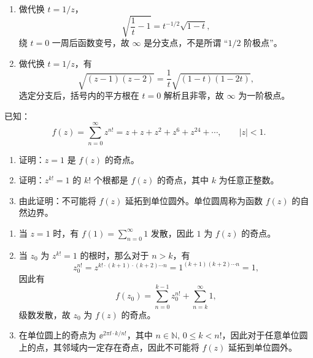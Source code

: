 \begin{question}
\begin{solution}
\begin{enumerate}
  \item 做代换 \(t=1/z\)，
   \[
   \sqrt{\frac{1}{t}-1} = t^{-1/2}\sqrt{1-t},
   \]
   绕 \(t=0\) 一周后函数变号，故 \(\infty\) 是分支点，不是所谓
   “\(1/2\) 阶极点”。

  \item 做代换 \(t=1/z\)，有
   \[
   \sqrt{(z-1)(z-2)} = \frac{1}{t}\sqrt{(1-t)(1-2t)},
   \]
   选定分支后，括号内的平方根在 \(t=0\) 解析且非零，故
   \(\infty\) 为一阶极点。
\end{enumerate}
\end{solution}
\end{question}

\begin{question}
已知：
\[
f(z)=\sum_{n=0}^\infty z^{n!}=z+z+z^2+z^6+z^{24}+\cdots,\qquad |z|<1.
\]
\begin{enumerate}
  \item 证明：\(z=1\) 是 \(f(z)\) 的奇点。
  \item 证明：\(z^{k!}=1\) 的 \(k!\) 个根都是 \(f(z)\) 的奇点，其中 \(k\) 为任意正整数。
  \item 由此证明：不可能将 \(f(z)\) 延拓到单位圆外。单位圆周称为函数 \(f(z)\) 的自然边界。
\end{enumerate}

\begin{solution}
\begin{enumerate}
  \item 当 \(z=1\) 时，有 \(f(1)=\displaystyle\sum_{n=0}^\infty 1\) 发散，因此 \(1\) 为 \(f(z)\) 的奇点。

  \item 当 \(z_0\) 为 \(z^{k!}=1\) 的根时，那么对于 \(n>k\)，有
   \[
   z_0^{n!} = z^{k!\cdot (k+1)\cdot (k+2)\cdots n} = 1^{(k+1)(k+2)\cdots n} = 1,
   \]
   因此有
   \[
   f(z_0) = \sum_{n=0}^{k-1} z_0^{n!} + \sum_{n=k}^\infty 1,
   \]
   级数发散，故 \(z_0\) 为 \(f(z)\) 的奇点。

  \item 在单位圆上的奇点为 \(\ee^{2\pi \ii \cdot k/n!}\)，其中 \(n\in\mathbb{N},\,0\le k<n!\)，因此对于任意单位圆上的点，其邻域内一定存在奇点，因此不可能将 \(f(z)\) 延拓到单位圆外。
\end{enumerate}
\end{solution}
\end{question}

